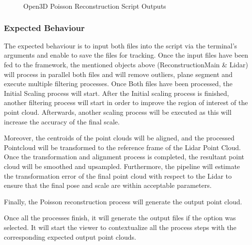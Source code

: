 \documentclass[12pt]{report}
\begin{document}
\begin{figure}[H]
  \qquad
\caption{Open3D Poisson Reconstruction Script Outputs}
\label{fig:open3dpossionscreipt} 
\end{figure}

 
\subsubsection{Expected Behaviour}
The expected behaviour is to input both files into the script via the terminal's arguments and enable to save the files for tracking. 
Once the input files have been fed to the framework, the mentioned objects above (ReconstructionMain \& Lidar) will process in parallel both files and will remove outliers, plane segment and execute multiple filtering processes.
Once Both files have been processed, the Initial Scaling process will start. After the Initial scaling process is finished, another filtering process will start in order to improve the region of interest of the point cloud.
Afterwards, another scaling process will be executed as this will increase the accuracy of the final scale. 

Moreover, the centroids of the point clouds will be aligned, and the processed Pointcloud will be transformed to the reference frame of the Lidar Point Cloud.
Once the transformation and alignment process is completed, the resultant point cloud will be smoothed and upsampled.
Furthermore, the pipeline will estimate the transformation error of the final point cloud with respect to the Lidar to ensure that the final pose and scale are within acceptable parameters. 

Finally, the Poisson reconstruction process will generate the output point cloud. 

Once all the processes finish, it will generate the output files if the option was selected. It will start the viewer to contextualize all the process steps with the corresponding expected output point clouds.
\end{document}
